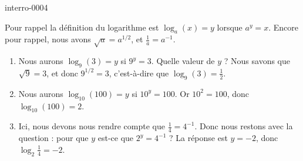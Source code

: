 
\begin{corrige}{interro-0004}

	Pour rappel la définition du logarithme est $\log_a(x)=y$ lorsque $a^y=x$. Encore pour rappel, nous avons $\sqrt{a}=a^{1/2}$, et $\frac{1}{ a }=a^{-1}$.

	\begin{enumerate}
		\item
			Nous aurons $\log_9(3)=y$ si $9^y=3$. Quelle valeur de $y$ ? Nous savons que $\sqrt{9}=3$, et donc $9^{1/2}=3$, c'est-à-dire que $\log_9(3)=\frac{ 1 }{2}$.
		\item
			Nous aurons $\log_{10}(100)=y$ si $10^y=100$. Or $10^2=100$, donc $\log_{10}(100)=2$.
		\item
			Ici, nous devons nous rendre compte que $\frac{1}{ 4 }=4^{-1}$. Donc nous restons avec la question : pour que $y$ est-ce que $2^y=4^{-1}$ ? La réponse est $y=-2$, donc $\log_2\frac{1}{ 4 }=-2$.

	\end{enumerate}

\end{corrige}
